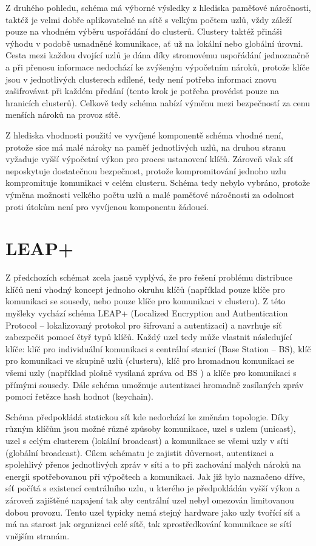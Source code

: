 \documentclass[11pt,final,twoside]{fithesis2}
\begin{document}
Z druhého pohledu, schéma má výborné výsledky z hlediska paměťové náročnosti, taktéž je velmi dobře aplikovatelné na sítě s velkým
počtem uzlů, vždy záleží pouze na vhodném výběru uspořádání do clusterů. Clustery taktéž přináši výhodu v podobě usnadněné komunikace, ať 
už na lokální nebo globální úrovni. Cesta mezi každou dvojící uzlů je dána díky stromovému uspořádání jednoznačně a při přenosu informace 
nedochází ke zvýšeným výpočetním nároků, protože klíče jsou v jednotlivých clusterech sdílené, tedy není potřeba informaci znovu 
zašifrovávat při každém předání (tento krok je potřeba provédst pouze na hranicích clusterů). Celkově tedy schéma nabízí výměnu mezi 
bezpečností za cenu menších nároků na provoz sítě. 

Z hlediska vhodnosti použití ve vyvíjené komponentě schéma vhodné není, protože sice má malé nároky na paměť jednotlivých uzlů, na druhou 
stranu vyžaduje vyšší výpočetní výkon pro proces ustanovení klíčů. Zároveň však síť neposkytuje dostatečnou bezpečnost, protože 
kompromitování jednoho uzlu kompromituje komunikaci v celém clusteru. Schéma tedy nebylo vybráno, protože výměna možnosti velkého počtu
uzlů a malé paměťové náročnosti za odolnost proti útokům není pro vyvíjenou komponentu žádoucí. 

\section{LEAP+}
Z předchozích schémat zcela jasně vyplývá, že pro řešení problému distribuce klíčů není vhodný koncept jednoho okruhu klíčů (například pouze klíče pro komunikaci se sousedy, nebo pouze
klíče pro komunikaci v clusteru). Z této myšleky vychází schéma LEAP+ \cite{Zhu2006} (Localized Encryption and Authentication Protocol -- lokalizovaný protokol pro šifrovaní a autentizaci) 
a navrhuje síť zabezpečit pomocí čtyř typů klíčů. Každý uzel tedy může vlastnit následující klíče: klíč pro individuální komunikaci s centrální stanicí (Base Station -- BS), klíč pro komunikaci 
ve skupině uzlů (clusteru), klíč pro hromadnou komunikaci se všemi uzly (například plošně vysílaná zpráva od BS ) a klíče pro komunikaci s přímými sousedy. Dále schéma umožnuje autentizaci hromadně 
zasílaných zpráv pomocí řetězce hash hodnot (keychain). 

Schéma předpokládá statickou síť kde nedochází ke změnám topologie. Díky různým klíčům jsou možné různé způsoby komunikace, uzel s uzlem (unicast), uzel s celým clusterem (lokální broadcast) 
a komunikace se všemi uzly v síti (globální broadcast). Cílem schématu je zajistit důvernost, autentizaci a spolehlivý přenos jednotlivých zpráv v síti a to při zachování malých nároků
na energii spotřebovanou při výpočtech a komunikaci. Jak již bylo naznačeno dříve, síť počítá s existencí centrálního uzlu, u kterého je předpokládán vyšší výkon a zároveň zajištěné napajení tak 
aby centrální uzel nebyl omezován limitovanou dobou provozu. Tento uzel typicky nemá stejný hardware jako uzly tvořící síť a má na starost jak organizaci celé sítě, tak zprostředkování komunikace se 
sítí vnějším stranám.  
\end{document}
